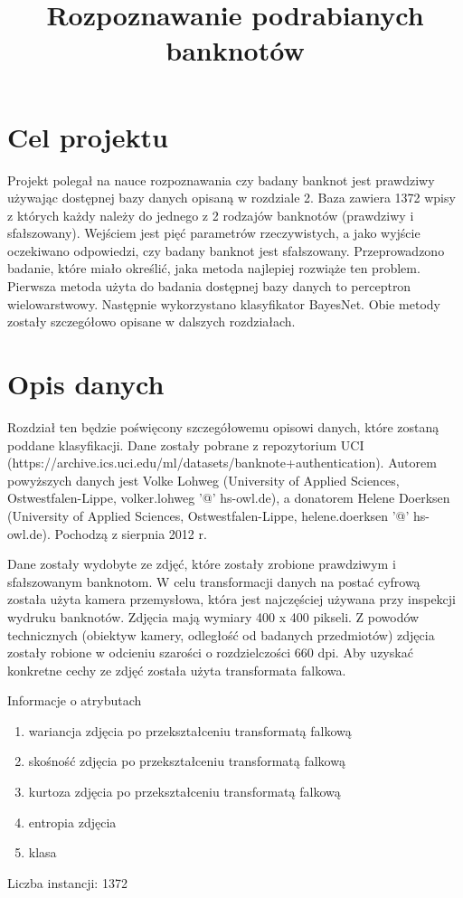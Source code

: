 \documentclass{classrep}
\author{
  \studentinfo{Norbert Landrat}{213518} \and
  \studentinfo{Adrian Grzelak}{213506}
}
\title{Rozpoznawanie podrabianych banknotów}
\begin{document}
\maketitle

\section{Cel projektu}
Projekt polegał na nauce rozpoznawania czy badany banknot jest prawdziwy używając dostępnej bazy danych opisaną w rozdziale 2. Baza zawiera 1372 wpisy z których każdy należy do jednego z 2 rodzajów banknotów (prawdziwy i sfałszowany). Wejściem jest pięć parametrów rzeczywistych, a jako wyjście oczekiwano odpowiedzi, czy badany banknot jest sfałszowany. Przeprowadzono badanie, które miało określić, jaka metoda najlepiej rozwiąże ten problem. Pierwsza metoda użyta do badania dostępnej bazy danych to perceptron wielowarstwowy. Następnie wykorzystano klasyfikator BayesNet. Obie metody zostały szczegółowo opisane w dalszych rozdziałach.

\section{Opis danych}
Rozdział ten będzie poświęcony szczegółowemu opisowi danych, które zostaną poddane klasyfikacji. Dane zostały pobrane z repozytorium UCI (https://archive.ics.uci.edu/ml/datasets/banknote+authentication). Autorem powyższych danych jest Volke Lohweg (University of Applied Sciences, Ostwestfalen-Lippe, volker.lohweg '@' hs-owl.de), a donatorem Helene Doerksen (University of Applied Sciences, Ostwestfalen-Lippe, helene.doerksen '@' hs-owl.de). Pochodzą z sierpnia 2012 r.

Dane zostały wydobyte ze zdjęć, które zostały zrobione prawdziwym i sfałszowanym banknotom. W celu transformacji danych na postać cyfrową została użyta kamera przemysłowa, która jest najczęściej używana przy inspekcji wydruku banknotów. Zdjęcia mają wymiary 400 x 400 pikseli. Z powodów technicznych (obiektyw kamery, odległość od badanych przedmiotów) zdjęcia zostały robione w odcieniu szarości  o rozdzielczości 660 dpi. Aby uzyskać konkretne cechy ze zdjęć została użyta transformata falkowa. 

Informacje o atrybutach
\begin{enumerate}
\item wariancja zdjęcia po przekształceniu transformatą falkową
\item skośność zdjęcia po przekształceniu transformatą falkową
\item kurtoza zdjęcia po przekształceniu transformatą falkową
\item entropia zdjęcia
\item klasa
\end{enumerate}
Liczba instancji: 1372
\end{document}
